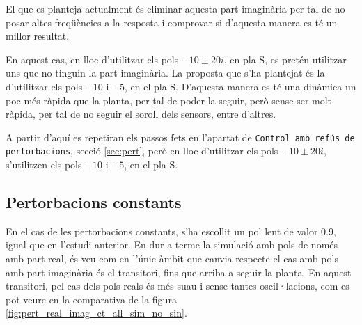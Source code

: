 \documentclass[12pt,a4paper,final,twoside,openright]{report}
\begin{document}
El que es planteja actualment és eliminar aquesta part imaginària per tal de no posar altes freqüències a la resposta i comprovar si d'aquesta manera es té un millor resultat.

En aquest cas, en lloc d'utilitzar els pols $-10\pm20i$, en pla S, es pretén utilitzar uns que no tinguin la part imaginària. La proposta que s'ha plantejat és la d'utilitzar els pols $-10$ i $-5$, en el pla S. D'aquesta manera es té una dinàmica un poc més ràpida que la planta, per tal de poder-la seguir, però sense ser molt ràpida, per tal de no seguir el soroll dels sensors, entre d'altres.

A partir d'aquí es repetiran els passos fets en l'apartat de \texttt{Control amb refús de pertorbacions}, secció \ref{sec:pert}, però en lloc d'utilitzar els pols $-10\pm20i$, s'utilitzen els pols $-10$ i $-5$, en el pla S.

\subsection{Pertorbacions constants}

En el cas de les pertorbacions constants, s'ha escollit un pol lent de valor $0.9$, igual que en l'estudi anterior. En dur a terme la simulació amb pols de només amb part real, és veu com en l'únic àmbit que canvia respecte el cas amb pols amb part imaginària és el transitori, fins que arriba a seguir la planta. En aquest transitori, pel cas dels pols reals és més suau i sense tantes oscil·lacions, com es pot veure en la comparativa de la figura \ref{fig:pert_real_imag_ct_all_sim_no_sin}.
\end{document}
